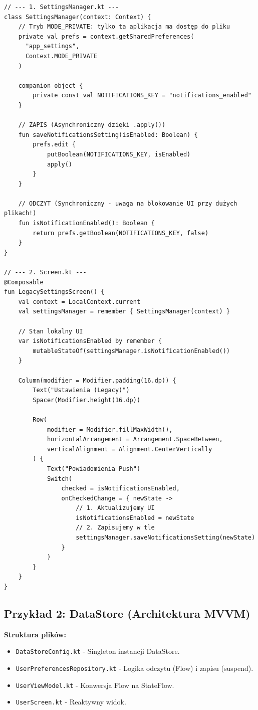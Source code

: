 \begin{verbatim}
// --- 1. SettingsManager.kt ---
class SettingsManager(context: Context) {
    // Tryb MODE_PRIVATE: tylko ta aplikacja ma dostęp do pliku
    private val prefs = context.getSharedPreferences(
      "app_settings", 
      Context.MODE_PRIVATE
    )

    companion object {
        private const val NOTIFICATIONS_KEY = "notifications_enabled"
    }

    // ZAPIS (Asynchroniczny dzięki .apply())
    fun saveNotificationsSetting(isEnabled: Boolean) {
        prefs.edit {
            putBoolean(NOTIFICATIONS_KEY, isEnabled)
            apply()
        }
    }

    // ODCZYT (Synchroniczny - uwaga na blokowanie UI przy dużych plikach!)
    fun isNotificationEnabled(): Boolean {
        return prefs.getBoolean(NOTIFICATIONS_KEY, false)
    }
}

// --- 2. Screen.kt ---
@Composable
fun LegacySettingsScreen() {
    val context = LocalContext.current
    val settingsManager = remember { SettingsManager(context) }
    
    // Stan lokalny UI
    var isNotificationsEnabled by remember { 
        mutableStateOf(settingsManager.isNotificationEnabled()) 
    }

    Column(modifier = Modifier.padding(16.dp)) {
        Text("Ustawienia (Legacy)")
        Spacer(Modifier.height(16.dp))
        
        Row(
            modifier = Modifier.fillMaxWidth(),
            horizontalArrangement = Arrangement.SpaceBetween,
            verticalAlignment = Alignment.CenterVertically
        ) {
            Text("Powiadomienia Push")
            Switch(
                checked = isNotificationsEnabled,
                onCheckedChange = { newState ->
                    // 1. Aktualizujemy UI
                    isNotificationsEnabled = newState
                    // 2. Zapisujemy w tle
                    settingsManager.saveNotificationsSetting(newState)
                }
            )
        }
    }
}
\end{verbatim}

\subsection{Przykład 2: DataStore (Architektura MVVM)}

\textbf{Struktura plików:}
\begin{itemize}
    \item \texttt{DataStoreConfig.kt} - Singleton instancji DataStore.
    \item \texttt{UserPreferencesRepository.kt} - Logika odczytu (Flow) i zapisu (suspend).
    \item \texttt{UserViewModel.kt} - Konwersja Flow na StateFlow.
    \item \texttt{UserScreen.kt} - Reaktywny widok.
\end{itemize}

